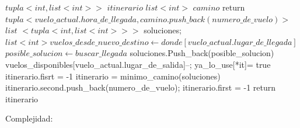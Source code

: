 \documentclass{article}
\begin{document}
\vspace{0.2cm}
\begin{algorithmic}[1]

        \State $tupla<int , list<int> >$ $itinerario$ 
        		\State $list<int>$ $camino$
        		\State return $tupla<vuelo\_actual.hora\_de\_llegada, camino.push\_back(numero\_de\_vuelo) >$
        	\Else 
       			\State $list$ $<tupla<int, list<int> > >$ soluciones;
       			\State $list<int> vuelos\_desde\_nuevo\_destino \gets donde[vuelo\_actual.lugar\_de\_llegada]$ 		 
						\State $posible\_solucion\gets buscar\_llegada$
						\State soluciones.Push\_back(posible\_solucion)
						\State vuelos\_disponibles[vuelo\_actual.lugar\_de\_salida]--;
						\State ya\_lo\_use[*it]= true
					\EndIf					
				\EndFor
					\State itinerario.fisrt = -1
				\Else
					\State itinerario =  minimo\_camino(soluciones)
					\State itinerario.second.push\_back(numero\_de\_vuelo);
				\EndIf
			\Else
				\State itinerario.first = -1
			\EndIf
			\State return itinerario
		 \EndIf			 	
\EndProcedure
\end{algorithmic}

\vspace{0.2cm}
{\noindent \Huge Complejidad:}
\newline \newline
\end{document}
